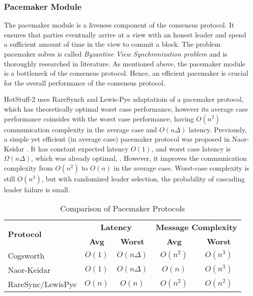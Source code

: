 
\subsubsection{Pacemaker Module}
The pacemaker module is a liveness component of the consensus protocol.
It ensures that parties eventually arrive at a view with an honest leader and spend a sufficient amount of time in the view to commit a block.
The problem pacemaker solves is called \emph{Byzantine View Synchronization problem} and is thoroughly researched in literature.
As mentioned above, the pacemaker module is a bottleneck of the consensus protocol. Hence, an efficient pacemaker is crucial for
the overall performance of the consensus protocol.

HotStuff-2 uses RareSynch \cite{RareSync} and Lewis-Pye \cite{LewisPye} adaptatioin of a pacemaker protocol,
which has theoretically optimal worst case performance,
however its average case performance coinsides with the worst case performance, having $O(n^2)$ communication complexity in the average case and $O(n\Delta)$ latency.
Previously, a simple yet efficient (in average case) pacemaker protocol was proposed in Naor-Keidar \cite{NaorKeidar}.
It has constant expected latency $O(1)$, and worst case latency is $\Omega(n\Delta)$,
which was already optimal, \cite{FLP_like}. However, it improves the communication complexity from $O(n^2)$ to $O(n)$ in the average case.
Worst-case complexity is still $O(n^3)$, but with randomized leader selection, the probability of cascading leader failure is small.

\begin{table}[h]
    \centering
    \begin{tabular}{|l|cc|cc|}
    \hline
    \multirow{2}{*}{\textbf{Protocol}} & \multicolumn{2}{c|}{\textbf{Latency}} & \multicolumn{2}{c|}{\textbf{Message Complexity}} \\ 
     & \textbf{Avg} & \textbf{Worst} & \textbf{Avg} & \textbf{Worst} \\ 
    \hline 
    Cogsworth\cite{Cogsworth} & \(O(1)\) & \(O(n\Delta)\) & \(O(n^2)\) & \(O(n^3)\) \\
    Naor-Keidar\cite{NaorKeidar} & \(O(1)\) & \(O(n\Delta)\) & \(O(n)\) & \(O(n^3)\) \\
    RareSync/LewisPye\cite{RareSync,LewisPye} & \(O(n)\) & \(O(n)\) & \(O(n^2)\) & \(O(n^2)\) \\
    \hline
    \end{tabular}
    \caption{Comparison of Pacemaker Protocols}
    \label{table:pacemaker-comparison}
\end{table}

